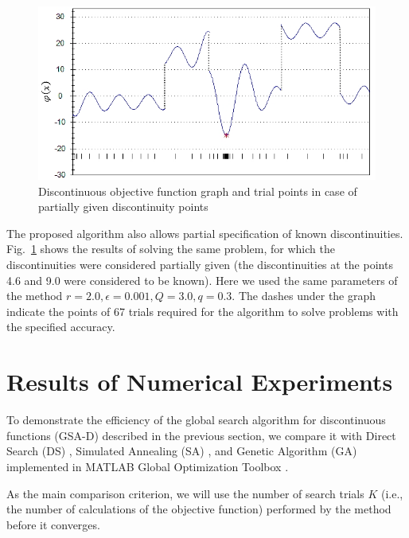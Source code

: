 \documentclass[runningheads]{llncs}
\begin{document}
\begin{figure}%
	\begin{center}
			\includegraphics[width=0.9\linewidth]{ris_3.jpg}
			\caption{Discontinuous objective function graph and trial points in case of partially given discontinuity points}
      \label{ris3}
	\end{center}
\end{figure}

The proposed algorithm also allows partial specification of known discontinuities. Fig.~\ref{ris3} shows the results of solving the same problem, for which the discontinuities were considered partially given (the discontinuities at the points 4.6 and 9.0 were considered to be known). Here we used the same parameters of the method $r=2.0, \epsilon=0.001, Q=3.0, q=0.3$. The dashes under the graph indicate the points of 67 trials required for the algorithm to solve problems with the specified accuracy.

\section{Results of Numerical Experiments}

To demonstrate the efficiency of the global search algorithm for discontinuous functions (GSA-D) described in the previous section, we compare it with Direct Search (DS) \cite{Audet}, Simulated Annealing (SA) \cite{Kirkpatrick}, and Genetic Algorithm (GA) \cite{Goldberg} implemented in MATLAB Global Optimization Toolbox \cite{MatlabOTB}.

As the main comparison criterion, we will use the number of search trials $K$ (i.e., the number of calculations of the objective function) performed by the method before it converges.
\end{document}

